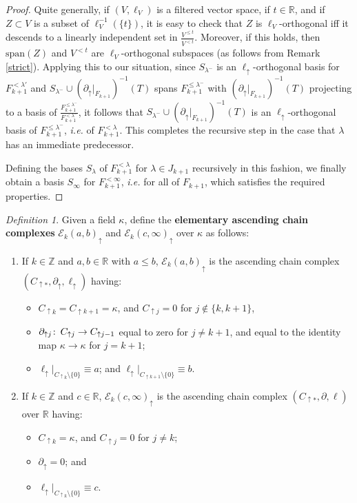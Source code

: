 \documentclass[11pt]{amsart}
\theoremstyle{definition}
\theoremstyle{remark}
\newtheorem{dfn}[theorem]{Definition}
\numberwithin{equation}{section}
\def\co{\colon\thinspace}
\def\R{\mathbb{R}}
\def\Z{\mathbb{Z}}
\begin{document}
\begin{proof}
	Quite generally, if $(V,\ell_V)$ is a filtered vector space, if $t\in \R$, and if $Z\subset V$ is a subset of $\ell_{V}^{-1}(\{t\})$, it is easy to check that $Z$ is $\ell_V$-orthogonal iff it descends to a linearly independent set in $\frac{V^{\leq t}}{V^{<t}}$.  Moreover, if this holds, then $\mathrm{span}(Z)$ and $V^{<t}$ are $\ell_V$-orthogonal subspaces (as follows from Remark \ref{strict}).  Applying this to our situation, since $S_{\lambda^-}$ is an $\ell_{\uparrow}$-orthogonal basis for $F_{k+1}^{<\lambda'}$ and $S_{\lambda^-}\cup  (\partial_{\uparrow}|_{F_{k+1}})^{-1}(T)$ spans $F_{k+1}^{\leq\lambda^-}$ with $ (\partial_{\uparrow}|_{F_{k+1}})^{-1}(T)$ projecting to a basis of $\frac{F_{k+1}^{\leq\lambda^-}}{F_{k+1}^{<\lambda^-}}$, it follows that $S_{\lambda^-}\cup  (\partial_{\uparrow}|_{F_{k+1}})^{-1}(T)$ is an $\ell_{\uparrow}$-orthogonal basis of $F_{k+1}^{\leq \lambda^-}$, \emph{i.e.} of $F_{k+1}^{<\lambda}$.  This completes the recursive step in the case that $\lambda$ has an immediate predecessor.
	
	Defining the bases $S_{\lambda}$ of $F_{k+1}^{<\lambda}$ for $\lambda\in J_{k+1}$ recursively in this fashion, we finally obtain a basis $S_{\infty}$ for $F_{k+1}^{<\infty}$, \emph{i.e.} for all of $F_{k+1}$, which satisfies the required properties.
\end{proof}

\begin{dfn}\label{elemdfn} Given a field $\kappa$, define the \textbf{elementary ascending chain complexes} $\mathcal{E}_k(a,b)_{\uparrow}$ and $\mathcal{E}_k(c,\infty)_{\uparrow}$ over $\kappa$ as follows: \begin{enumerate}\item
		If $k\in \Z$ and $a,b\in\R$ with $a\leq b$,  $\mathcal{E}_k(a,b)_{\uparrow}$ is the ascending chain complex $(C_{\uparrow *},\partial_{\uparrow},\ell_{\uparrow})$ having: \begin{itemize} \item $C_{\uparrow k}=C_{\uparrow k+1}=\kappa$, and $C_{\uparrow j}=0$ for $j\notin\{k,k+1\}$, \item $\partial_{\uparrow j}\co C_{\uparrow j}\to C_{\uparrow j-1}$ equal to zero for $j\neq k+1$, and equal to the identity map $\kappa\to\kappa$ for $j=k+1$;
			\item $\ell_{\uparrow}|_{C_{\uparrow k}\setminus\{0\}}\equiv a$; and $\ell_{\uparrow}|_{C_{\uparrow k+1}\setminus\{0\}}\equiv b$.\end{itemize}	
		\item If $k\in \Z$ and $c\in \R$, $\mathcal{E}_k(c,\infty)_{\uparrow}$ is the ascending  chain complex $(C_{\uparrow *},\partial,\ell)$ over $\R$ having:
		\begin{itemize} \item $C_{\uparrow k}=\kappa$, and $C_{\uparrow j}=0$ for $j\neq k$;
			\item $\partial_{\uparrow}=0$; and
			\item $\ell_{\uparrow}|_{C_{\uparrow k}\setminus\{0\}}\equiv c$.\end{itemize}\end{enumerate}
\end{dfn}
\end{document}

